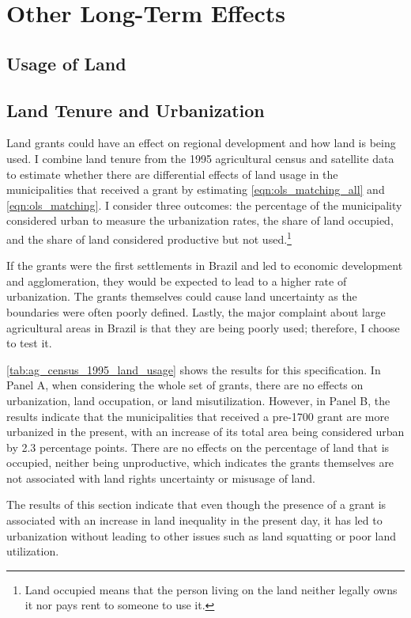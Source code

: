 \documentclass[11pt]{article}
\begin{document}
\section{Other Long-Term Effects}
\label{sec:other_effects}

\subsection{Usage of Land}

\subsection{Land Tenure and Urbanization}

Land grants could have an effect on regional development and how land is being used. 
I combine land tenure from the 1995 agricultural census and satellite data to estimate whether there are differential effects of land usage in the municipalities that received a grant by estimating \autoref{eqn:ols_matching_all} and \autoref{eqn:ols_matching}. 
I consider three outcomes: the percentage of the municipality considered urban to measure the urbanization rates, the share of land occupied, and the share of land considered productive but not used.\footnote{Land occupied means that the person living on the land neither legally owns it nor pays rent to someone to use it.}

If the grants were the first settlements in Brazil and led to economic development and agglomeration, they would be expected to lead to a higher rate of urbanization.
The grants themselves could cause land uncertainty as the boundaries were often poorly defined.
Lastly, the major complaint about large agricultural areas in Brazil is that they are being poorly used; therefore, I choose to test it.

\autoref{tab:ag_census_1995_land_usage} shows the results for this specification. 
In Panel A, when considering the whole set of grants, there are no effects on urbanization, land occupation, or land misutilization.
However, in Panel B, the results indicate that the municipalities that received a pre-1700 grant are more urbanized in the present, with an increase of its total area being considered urban by 2.3 percentage points. 
There are no effects on the percentage of land that is occupied, neither being unproductive, which indicates the grants themselves are not associated with land rights uncertainty or misusage of land.

The results of this section indicate that even though the presence of a grant is associated with an increase in land inequality in the present day, it has led to urbanization without leading to other issues such as land squatting or poor land utilization.
\end{document}
